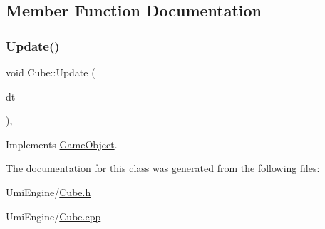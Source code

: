 \subsection{Member Function Documentation}
\mbox{\label{class_cube_a52a6950310f4529d9a3df4bc60c0625b}} 
\subsubsection{\texorpdfstring{Update()}{Update()}}
{\footnotesize\ttfamily void Cube\+::\+Update (\begin{DoxyParamCaption}\item[{G\+Lfloat}]{dt }\end{DoxyParamCaption})\hspace{0.3cm}{\ttfamily [override]}, {\ttfamily [virtual]}}



Implements \mbox{\hyperlink{class_game_object_aa100c768006aca3e7cdbabe27b48b9e5}{Game\+Object}}.



The documentation for this class was generated from the following files\+:\begin{DoxyCompactItemize}
\item 
Umi\+Engine/\mbox{\hyperlink{_cube_8h}{Cube.\+h}}\item 
Umi\+Engine/\mbox{\hyperlink{_cube_8cpp}{Cube.\+cpp}}\end{DoxyCompactItemize}
